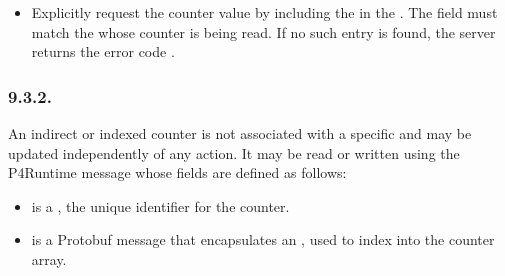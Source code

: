 \documentclass[11pt]{article}
\begin{document}
{\begin{itemize}
\item{}
Explicitly request the counter value by including the  in
the . The  field must match the 
whose counter is being read. If no such entry is found, the server returns the
error code .%
\end{itemize}%

\subsubsection{9.3.2.\hspace*{0.5em}}\label{sec-counterentry}%

\noindent{}An indirect or indexed counter is not associated with a specific 
and may be updated independently of any action. It may be read or written using
the P4Runtime  message whose fields are defined as follows:%

\begin{itemize}%

\item{}
 is a , the unique identifier for the counter.%

\item{}
 is a Protobuf message that encapsulates an , used to index into
the counter array.%


\end{itemize}}
\end{document}
